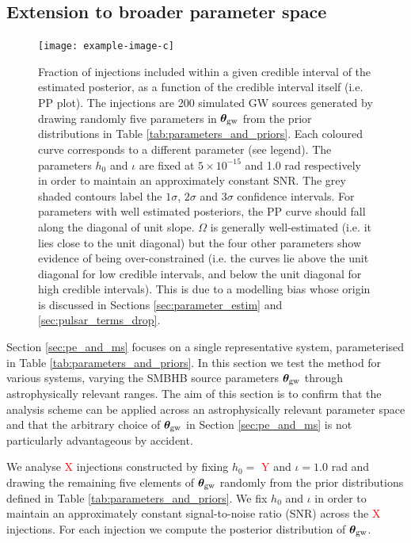 \documentclass[fleqn,usenatbib,useAMS]{mnras}
\begin{document}
\subsection{Extension to broader parameter space} \label{sec:parameter_space}
\begin{figure}
	\centering
	\texttt{[image: example-image-c]}
	\caption{Fraction of injections included within a given credible interval of the estimated posterior, as a function of the credible interval itself (i.e. PP plot). The injections are 200 simulated GW sources generated by drawing randomly five parameters in $\boldsymbol{\theta}_{\rm gw}$ from the prior distributions in Table \ref{tab:parameters_and_priors}. Each coloured curve corresponds to a different parameter (see legend). The parameters $h_0$ and $\iota$ are fixed at $5 \times 10^{-15}$ and 1.0 rad respectively in order to maintain an approximately constant SNR. The grey shaded contours label the $1\sigma$, $2\sigma$ and 3$\sigma$ confidence intervals. For parameters with well estimated posteriors, the PP curve should fall along the diagonal of unit slope. $\Omega$ is generally well-estimated (i.e. it lies close to the unit diagonal) but the four other parameters show evidence of being over-constrained (i.e. the curves lie above the unit diagonal for low credible intervals, and below the unit diagonal for high credible intervals). This is due to a modelling bias whose origin is discussed in Sections \ref{sec:parameter_estim} and \ref{sec:pulsar_terms_drop}.}
	\label{fig:parameter_space}
\end{figure}
Section \ref{sec:pe_and_ms} focuses on a single representative system, parameterised in Table \ref{tab:parameters_and_priors}. In this section we test the method for various systems, varying the SMBHB source parameters $\boldsymbol{\theta}_{\rm gw}$ through astrophysically relevant ranges. The aim of this section is to confirm that the analysis scheme can be applied across an astrophysically relevant parameter space and that the arbitrary choice of $\boldsymbol{\theta}_{\rm gw}$ in Section \ref{sec:pe_and_ms} is not particularly advantageous by accident. \newline 

 
We analyse \textcolor{red}{X} injections constructed by fixing $h_0 =$ \textcolor{red}{Y}  and $\iota =1.0$ rad and drawing the remaining five elements of $\boldsymbol{\theta}_{\rm gw}$ randomly from the prior distributions defined in Table \ref{tab:parameters_and_priors}. We fix $h_0$ and $\iota$ in order to maintain an approximately constant signal-to-noise ratio (SNR) across the  \textcolor{red}{X} injections. For each injection we compute the posterior distribution of ${\boldsymbol{\theta}}_{\rm gw}$. \newline 
\end{document}
